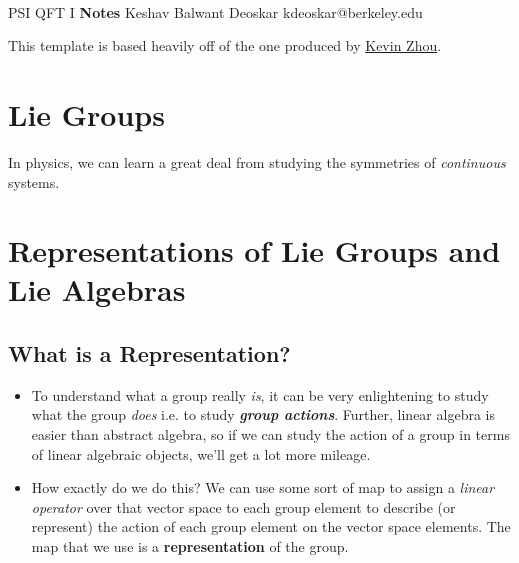 \documentclass[11pt]{article}
\begin{document}
\thispagestyle{empty}
\bigskip \
\vspace{0.1cm}

\begin{center}
{\fontsize{22}{22} \selectfont PSI QFT I}
\vskip 16pt
{\fontsize{36}{36} \selectfont \bf \sffamily Notes}
\vskip 24pt
{\fontsize{18}{18} \selectfont \rmfamily Keshav Balwant Deoskar} 
\vskip 6pt
{\fontsize{14}{14} \selectfont \ttfamily kdeoskar@berkeley.edu} 
\vskip 24pt
\end{center}





\vskip 0.5cm
This template is based heavily off of the one produced by \href{https://knzhou.github.io/}{Kevin Zhou}.

\tableofcontents 


\newpage
\section{Lie Groups}

\vskip 0.5cm
In physics, we can learn a great deal from studying the symmetries of \emph{continuous} systems. 


\newpage
\section{Representations of Lie Groups and Lie Algebras}
\subsection{What is a Representation?}
\begin{itemize}
    \item To understand what a group really \emph{is}, it can be very enlightening to study what the group \emph{does} i.e. to study \emph{\textbf{group actions}}. Further, linear algebra is easier than abstract algebra, so if we can study the action of a group in terms of linear algebraic objects, we'll get a lot more mileage.
    \item How exactly do we do this? We can use some sort of map to assign a \emph{linear operator} over that vector space to each group element to describe (or represent) the action of each group element on the vector space elements. The map that we use is a \textbf{representation} of the group.
\end{itemize}
\end{document}
